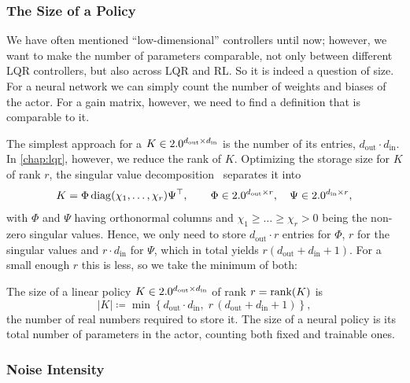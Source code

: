 \subsubsection{The Size of a Policy}
\label{subsubsec:policy-size}

We have often mentioned ``low-dimensional'' controllers until now; however,
we want to make the number of parameters comparable, not only
between different LQR controllers, but also across LQR and RL.
So it is indeed a question of size. For a neural network we can
simply count the number of weights and biases of the actor. For a gain matrix, however,
we need to find a definition that is comparable to it.

The simplest approach for a $K \in 2.0^{d_{\mathrm{out}} \times d_{\mathrm{in}}}$ is the number of its entries,
$d_{\mathrm{out}} \cdot d_{\mathrm{in}}$. In \cref{chap:lqr}, however, we reduce the rank of $K$.
Optimizing the storage size for $K$ of rank $r$, the singular value decomposition~\cite[p.~76, Thm.~2.4.1]{Golub2013Matrix}
separates it into
\begin{equation}
    \label{eq:svd}
    K = \Phi \operatorname{diag}(\chi_1, \dots, \chi_r) \Psi^{\top} ,
    \qquad
    \Phi \in 2.0^{d_{\mathrm{out}} \times r}, \quad
    \Psi \in 2.0^{d_{\mathrm{in}} \times r} ,
\end{equation}
with $\Phi$ and $\Psi$ having orthonormal columns and $\chi_1 \geq \dots \geq
\chi_r > 0$ being the non-zero singular values. Hence, we only need to
store $d_{\mathrm{out}} \cdot r$ entries for $\Phi$, $r$ for the singular values and
$r \cdot d_{\mathrm{in}}$ for $\Psi$, which in total yields $r(d_{\mathrm{out}} + d_{\mathrm{in}} + 1)$.
For a small enough $r$ this is less, so we take the minimum of both:

\begin{definition}
\label{def:policy-size}
The size of a linear policy $K \in 2.0^{d_{\mathrm{out}} \times d_{\mathrm{in}}}$ of rank
$r = \operatorname{rank}(K)$ is
\begin{equation*}
    \lvert K \rvert \coloneqq \min \left\{ d_{\mathrm{out}} \cdot d_{\mathrm{in}}, \; r \, (d_{\mathrm{out}} + d_{\mathrm{in}} + 1) \right\} ,
\end{equation*}
the number of real numbers required to store it.
The size of a neural policy is its total number of parameters in the
actor, counting both fixed and trainable ones.
\end{definition}

\subsubsection{Noise Intensity}
\label{subsubsec:noise-strength}

